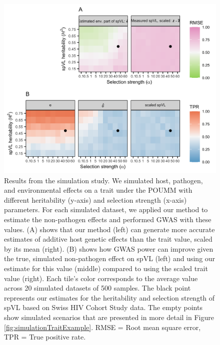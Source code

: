 \documentclass[11pt]{article}
\begin{document}
\begin{linenumbers}
\begin{figure}[H]
	\begin{center}
		\includegraphics[width=\linewidth]{figures/simulation_results}
		\caption{Results from the simulation study. We simulated host, pathogen, and environmental effects on a trait under the POUMM with different heritability (y-axis) and selection strength (x-axis) parameters. For each simulated dataset, we applied our method to estimate the non-pathogen effects and performed GWAS with these values. (A) shows that our method (left) can generate more accurate estimates of additive host genetic effects than the trait value, scaled by its mean (right). (B) shows how GWAS power can improve given the true, simulated non-pathogen effect on spVL (left) and using our estimate for this value (middle) compared to using the scaled trait value (right). Each tile's color corresponds to the average value across 20 simulated datasets of 500 samples. The black point represents our estimates for the heritability and selection strength of spVL based on Swiss HIV Cohort Study data. The empty points show simulated scenarios that are presented in more detail in Figure \ref{fig:simulationTraitExample}. RMSE = Root mean square error, TPR = True positive rate.}
		\label{fig:simulationResults}
	\end{center}
\end{figure}


\end{linenumbers}
\end{document}
